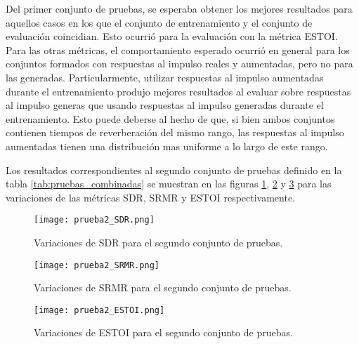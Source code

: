 Del primer conjunto de pruebas, se esperaba obtener los mejores resultados para aquellos casos en los que el conjunto de entrenamiento y el conjunto de evaluación coincidian. Esto ocurrió para la evaluación con la métrica ESTOI. Para las otras métricas, el comportamiento esperado ocurrió en general para los conjuntos formados con respuestas al impulso reales y aumentadas, pero no para las generadas. Particularmente, utilizar respuestas al impulso aumentadas durante el entrenamiento produjo mejores resultados al evaluar sobre respuestas al impulso generas que usando respuestas al impulso generadas durante el entrenamiento. Esto puede deberse al hecho de que, si bien ambos conjuntos contienen tiempos de reverberación del mismo rango, las respuestas al impulso aumentadas tienen una distribución mas uniforme a lo largo de este rango.

Los resultados correspondientes al segundo conjunto de pruebas definido en la tabla \ref{tab:pruebas_combinadas} se muestran en las figuras \ref{fig:2_SDR}, \ref{fig:2_SRMR} y \ref{fig:2_ESTOI} para las variaciones de las métricas SDR, SRMR y ESTOI respectivamente.

\begin{figure}[H]
	\centering{}
	\texttt{[image: prueba2\_SDR.png]}
	\caption{Variaciones de SDR para el segundo conjunto de pruebas.}
	\label{fig:2_SDR}
\end{figure}

\begin{figure}[H]
	\centering{}
	\texttt{[image: prueba2\_SRMR.png]}
	\caption{Variaciones de SRMR para el segundo conjunto de pruebas.}
	\label{fig:2_SRMR}
\end{figure}

\begin{figure}[H]
	\centering{}
	\texttt{[image: prueba2\_ESTOI.png]}
	\caption{Variaciones de ESTOI para el segundo conjunto de pruebas.}
	\label{fig:2_ESTOI}
\end{figure}

